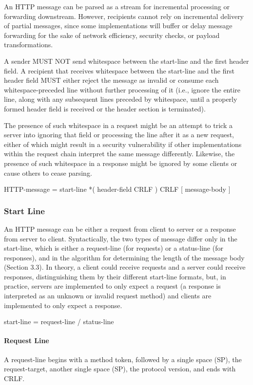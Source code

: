    An HTTP message can be parsed as a stream for incremental processing
   or forwarding downstream.  However, recipients cannot rely on
   incremental delivery of partial messages, since some implementations
   will buffer or delay message forwarding for the sake of network
   efficiency, security checks, or payload transformations.

   A sender MUST NOT send whitespace between the start-line and the
   first header field.  A recipient that receives whitespace between the
   start-line and the first header field MUST either reject the message
   as invalid or consume each whitespace-preceded line without further
   processing of it (i.e., ignore the entire line, along with any
   subsequent lines preceded by whitespace, until a properly formed
   header field is received or the header section is terminated).

   The presence of such whitespace in a request might be an attempt to
   trick a server into ignoring that field or processing the line after
   it as a new request, either of which might result in a security
   vulnerability if other implementations within the request chain
   interpret the same message differently.  Likewise, the presence of
   such whitespace in a response might be ignored by some clients or
   cause others to cease parsing.

  HTTP-message   = start-line
                   *( header-field CRLF )
                   CRLF
                   [ message-body ]

\subsubsection{Start Line}
An HTTP message can be either a request from client to server or a
   response from server to client.  Syntactically, the two types of
   message differ only in the start-line, which is either a request-line
   (for requests) or a status-line (for responses), and in the algorithm
   for determining the length of the message body (Section 3.3).
   In theory, a client could receive requests and a server could receive
   responses, distinguishing them by their different start-line formats,
   but, in practice, servers are implemented to only expect a request (a
   response is interpreted as an unknown or invalid request method) and
   clients are implemented to only expect a response.

     start-line     = request-line / status-line
\paragraph{Request Line}
A request-line begins with a method token, followed by a single space
   (SP), the request-target, another single space (SP), the protocol
   version, and ends with CRLF.

